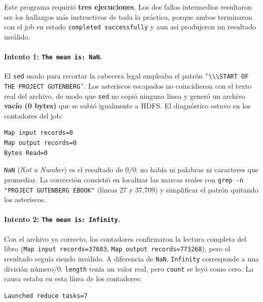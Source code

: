 Este programa requirió \textbf{tres ejecuciones}. Los dos fallos intermedios resultaron ser los hallazgos más instructivos de toda la práctica, porque ambos terminaron con el job en estado \texttt{completed successfully} y aun así produjeron un resultado inválido.

\paragraph{Intento 1: \texttt{The mean is: NaN}.} El \texttt{sed} usado para recortar la cabecera legal empleaba el patrón \texttt{'\textbackslash*\textbackslash*\textbackslash* START OF THE PROJECT GUTENBERG'}. Los asteriscos escapados no coincidieron con el texto real del archivo, de modo que \texttt{sed} no copió ninguna línea y generó un archivo \textbf{vacío (0 bytes)} que se subió igualmente a HDFS. El diagnóstico estuvo en los contadores del job:

\begin{lstlisting}[style=sh]
Map input records=0
Map output records=0
Bytes Read=0
\end{lstlisting}

\texttt{NaN} (\textit{Not a Number}) es el resultado de $0/0$: no había ni palabras ni caracteres que promediar. La corrección consistió en localizar las marcas reales con \texttt{grep -\bk{}n "PROJECT GUTENBERG EBOOK"} (líneas 27 y 37,709) y simplificar el patrón quitando los asteriscos.



\paragraph{Intento 2: \texttt{The mean is: Infinity}.} Con el archivo ya correcto, los contadores confirmaron la lectura completa del libro (\texttt{Map input records=\bk{}37683}, \texttt{Map output records=\bk{}773268}), pero el resultado seguía siendo inválido. A diferencia de \texttt{NaN}, \texttt{Infinity} corresponde a una división $\text{número}/0$: \texttt{length} tenía un valor real, pero \texttt{count} se leyó como cero. La causa estaba en esta línea de los contadores:

\begin{lstlisting}[style=sh]
Launched reduce tasks=7
\end{lstlisting}

